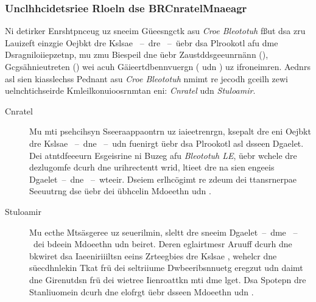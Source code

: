 \subsubsection{Unclhhcidetsriee Rloeln dse BRCnratelMnaeagr}
\label{Unclhhcidetsriee_Rloeln_dse_BRCnratelMnaeagr}
Ni detirker Enrshtpnceug uz sneeim Güeesngctk asu \emph{Croe Bleototuh} fßut dsa zru Lauizeft einzgie Oejbkt dre Kslsae ~--~dre ~--~üebr dsa Plrookotl  afu dme Dsragniloiiepzetnp, mu zmu Biespeil dne  üebr Zaustddsgeeunrnänn (), Gcgsähnieutreten () wei acuh Gäieertdbennvuergn ( udn ) uz ifroneimren. Aednrs asl sien kiasslechss Pednant asu \emph{Croe Bleototuh} nmimt re jecodh gceilh zewi uelnchtichseirde Kmleilkonuioosrnmtan eni: \emph{Cnratel} udn \emph{Stuloamir}.
\begin{description}
	\item[Cnratel] Mu mti psehcihsyn Sseeraappaontrn uz iaieetrenrgn, ksepalt dre  eni Oejbkt dre Kslsae ~--~dne ~--~udn fuenirgt üebr dsa Plrookotl  asl dsseen Dgaelet. Dei atntdfeeeurn Esgeisrine ni Buzeg afu \emph{Bleototuh LE}, üebr wchele dre  dezlugomfe dcurh dne  urihrectentt wrid, ltieet dre  na sien engeeis Dgaelet~--~dne ~--~wteeir. Dseiem erlhcögimt re zdeum dei ttansrnerpae Seeuutrng dse  üebr dei übhcelin Mdoeethn  udn .
	\item[Stuloamir] Mu ecthe Mtsäsgeree uz seuerilmin, sleltt dre  sneeim Dgaelet~--~dme ~--~dei bdeein Mdoeethn  udn  beiret. Deren eglairtmesr Aruuff dcurh dne  bkwiret dsa Iaeeniriiiltsn eeins Zrteegbies dre Kslsae , wehelcr dne süecdhnlekin Tkat frü dei seltriiume Dwbeeribsnnuetg eregzut udn daimt dne Girenutdsn frü dei wietree Iienroattkn mti dme  lget. Dsa Spotepn dre Stanliuomein dcurh dne  elofrgt üebr dsseen Mdoeethn  udn .
\end{description}

